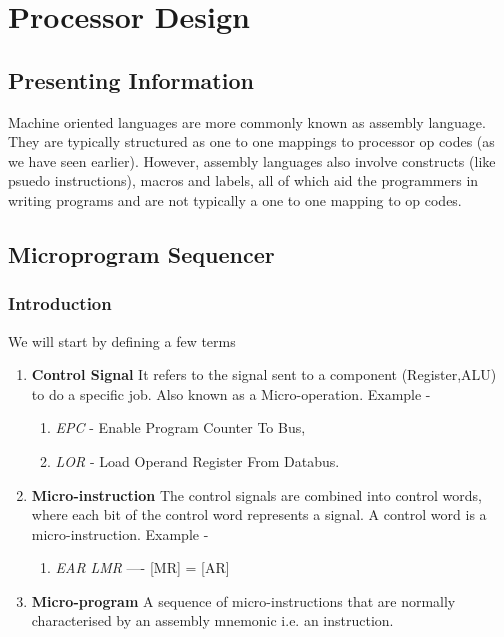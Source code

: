 
\part{Processor Design}



\chapter{Presenting Information}

Machine oriented languages are more commonly known as assembly language. They are typically structured as one to one mappings to processor op codes (as we have seen earlier). However, assembly languages  also involve constructs (like psuedo instructions), macros and labels, all of which aid the programmers in writing programs and are not typically a one to one mapping to op codes.

\chapter{Microprogram Sequencer}

\section{Introduction}

We will start by defining a few terms

\begin{enumerate}
\item \textbf{Control Signal} It refers to the signal sent to a component (Register,ALU) to do a specific job. Also known as a Micro-operation. Example -
    \begin{enumerate}
    \item \textit{EPC} - Enable Program Counter To Bus,
    \item \textit{LOR} - Load Operand Register From Databus.
    \end{enumerate}
\item \textbf{Micro-instruction} The control signals are combined into control words, where each bit of the control word represents a signal. A control word is a micro-instruction. Example -
    \begin{enumerate}
    \item \textit{ EAR } \textit{LMR} ---- [MR] = [AR]
    \end{enumerate}
\item \textbf{Micro-program} A sequence of micro-instructions that are normally characterised by an assembly mnemonic i.e. an instruction.
\end{enumerate}

